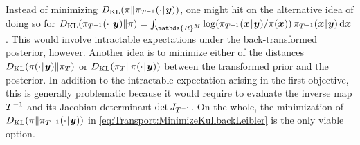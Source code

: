 Instead of minimizing \(D_{\mathrm{KL}}(\pi \| \pi_{T^{-1}}(\cdot {\:\!}|{\:\!} \bm{y}))\),
one might hit on the alternative idea of doing so for \(D_{\mathrm{KL}}(\pi_{\map^{-1}}(\cdot \cond \bm{y}) \| \pi)
= \int_{\mathds{R}^\dimParam} \log(\pi_{\map^{-1}}(\bm{x} \cond \bm{y}) / \pi(\bm{x})) \, \pi_{\map^{-1}}(\bm{x} \cond \bm{y}) \, \mathrm{d} \bm{x}\).
This would involve intractable expectations under the back-transformed posterior, however.
Another idea is to minimize either of the distances \(D_{\mathrm{KL}}(\pi(\cdot {\:\!}|{\:\!} \bm{y}) \| \pi_{T})\)
or \(D_{\mathrm{KL}}(\pi_{T} \| \pi(\cdot {\:\!}|{\:\!} \bm{y}))\) between the transformed prior and the posterior.
In addition to the intractable expectation arising in the first objective,
this is generally problematic because it would require to evaluate the inverse map \(T^{-1}\) and its Jacobian determinant \(\det J_{T^{-1}}\).
On the whole, the minimization of \(D_{\mathrm{KL}}(\pi \| \pi_{T^{-1}}(\cdot {\:\!}|{\:\!} \bm{y}))\) in \cref{eq:Transport:MinimizeKullbackLeibler} is the only viable option.